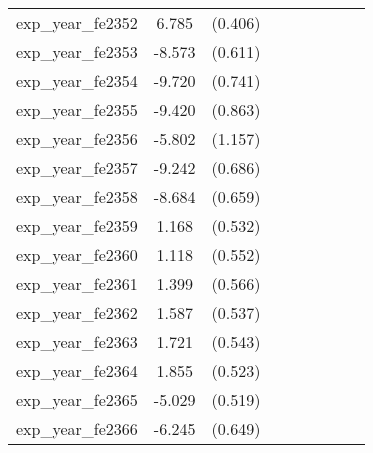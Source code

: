 {\begin{tabular}{l*{4}{cc}}
exp\_year\_fe2352&    6.785\sym{***}&  (0.406)&                  &         &                  &         &                  &         \\
exp\_year\_fe2353&   -8.573\sym{***}&  (0.611)&                  &         &                  &         &                  &         \\
exp\_year\_fe2354&   -9.720\sym{***}&  (0.741)&                  &         &                  &         &                  &         \\
exp\_year\_fe2355&   -9.420\sym{***}&  (0.863)&                  &         &                  &         &                  &         \\
exp\_year\_fe2356&   -5.802\sym{***}&  (1.157)&                  &         &                  &         &                  &         \\
exp\_year\_fe2357&   -9.242\sym{***}&  (0.686)&                  &         &                  &         &                  &         \\
exp\_year\_fe2358&   -8.684\sym{***}&  (0.659)&                  &         &                  &         &                  &         \\
exp\_year\_fe2359&    1.168\sym{*}  &  (0.532)&                  &         &                  &         &                  &         \\
exp\_year\_fe2360&    1.118\sym{*}  &  (0.552)&                  &         &                  &         &                  &         \\
exp\_year\_fe2361&    1.399\sym{*}  &  (0.566)&                  &         &                  &         &                  &         \\
exp\_year\_fe2362&    1.587\sym{**} &  (0.537)&                  &         &                  &         &                  &         \\
exp\_year\_fe2363&    1.721\sym{**} &  (0.543)&                  &         &                  &         &                  &         \\
exp\_year\_fe2364&    1.855\sym{***}&  (0.523)&                  &         &                  &         &                  &         \\
exp\_year\_fe2365&   -5.029\sym{***}&  (0.519)&                  &         &                  &         &                  &         \\
exp\_year\_fe2366&   -6.245\sym{***}&  (0.649)&                  &         &                  &         &                  &         \\

\end{tabular}}
